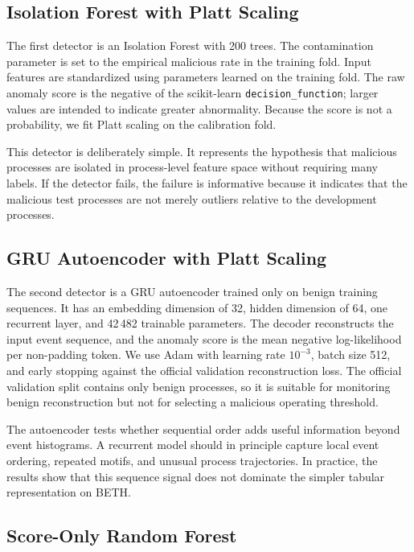 \documentclass[10pt,journal,compsoc]{IEEEtran}
\begin{document}
\subsection{Isolation Forest with Platt Scaling}

The first detector is an Isolation Forest \cite{liu2008} with 200 trees. The contamination parameter is set to the empirical malicious rate in the training fold. Input features are standardized using parameters learned on the training fold. The raw anomaly score is the negative of the scikit-learn \texttt{decision\_function}; larger values are intended to indicate greater abnormality. Because the score is not a probability, we fit Platt scaling on the calibration fold.

This detector is deliberately simple. It represents the hypothesis that malicious processes are isolated in process-level feature space without requiring many labels. If the detector fails, the failure is informative because it indicates that the malicious test processes are not merely outliers relative to the development processes.

\subsection{GRU Autoencoder with Platt Scaling}

The second detector is a GRU autoencoder trained only on benign training sequences. It has an embedding dimension of 32, hidden dimension of 64, one recurrent layer, and 42\,482 trainable parameters. The decoder reconstructs the input event sequence, and the anomaly score is the mean negative log-likelihood per non-padding token. We use Adam with learning rate $10^{-3}$, batch size 512, and early stopping against the official validation reconstruction loss. The official validation split contains only benign processes, so it is suitable for monitoring benign reconstruction but not for selecting a malicious operating threshold.

The autoencoder tests whether sequential order adds useful information beyond event histograms. A recurrent model should in principle capture local event ordering, repeated motifs, and unusual process trajectories. In practice, the results show that this sequence signal does not dominate the simpler tabular representation on BETH.

\subsection{Score-Only Random Forest}
\end{document}
